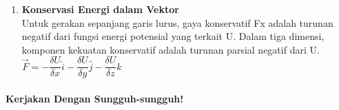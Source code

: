 \documentclass[12pt,a4paper,draft,final,oneside,twoside,openright,openany]{article}
\begin{document}
\begin{enumerate}
			\item \textbf{Konservasi Energi dalam Vektor}\\
			Untuk gerakan sepanjang garis lurus, gaya konservatif Fx adalah
			turunan negatif dari fungsi energi potensial yang terkait U. Dalam tiga dimensi, komponen kekuatan konservatif adalah turunan parsial negatif dari U.\\
					$\vec{F}=-\dfrac{\delta U}{\delta x}\hat{i}-\dfrac{\delta U}{\delta y}\hat{j}-\dfrac{\delta U}{\delta z}\hat{k}$
			
		\end{enumerate}
	\noindent\makebox[\linewidth]{\rule{\paperwidth}{0.4pt}}
	\paragraph{Kerjakan Dengan Sungguh-sungguh!}
\end{document}
